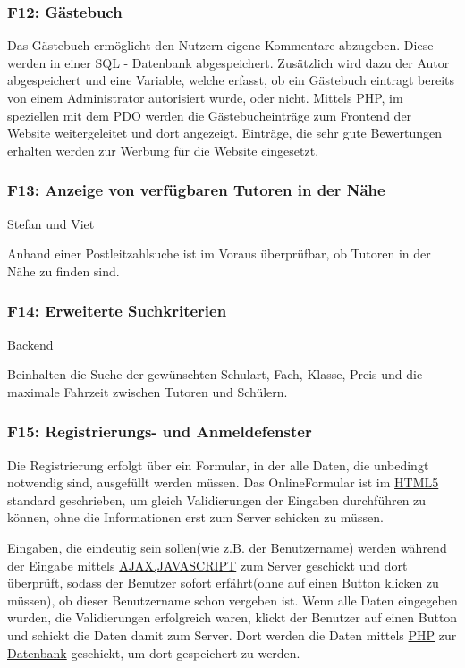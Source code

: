 \documentclass[10pt,a4paper]{scrartcl}
\begin{document}
\subsubsection*{F12: Gästebuch}

Das Gästebuch ermöglicht den Nutzern eigene Kommentare abzugeben. Diese werden in einer SQL - Datenbank abgespeichert. Zusätzlich wird dazu der Autor abgespeichert und eine Variable, welche erfasst, ob ein Gästebuch eintragt bereits von einem Administrator autorisiert wurde, oder nicht. Mittels PHP, im speziellen mit dem PDO werden die Gästebucheinträge zum Frontend der Website weitergeleitet und dort angezeigt. Einträge, die sehr gute Bewertungen erhalten werden zur Werbung für die Website eingesetzt.

\subsubsection*{F13: Anzeige von verfügbaren Tutoren in der Nähe}

Stefan und Viet

Anhand einer Postleitzahlsuche ist im Voraus überprüfbar, ob Tutoren in der Nähe zu finden sind.

\subsubsection*{F14: Erweiterte Suchkriterien}

Backend

Beinhalten die Suche der gewünschten Schulart, Fach, Klasse, Preis und die maximale Fahrzeit zwischen Tutoren und Schülern. 

\subsubsection*{F15: Registrierungs- und Anmeldefenster}

Die Registrierung erfolgt über ein Formular, in der alle Daten, die unbedingt notwendig sind, ausgefüllt werden müssen.
Das OnlineFormular ist im \underline{HTML5} standard geschrieben, um gleich Validierungen der Eingaben durchführen zu können, 
ohne die Informationen erst zum Server schicken zu müssen.

Eingaben, die eindeutig sein sollen(wie z.B. der Benutzername) werden während der Eingabe mittels \underline{AJAX,JAVASCRIPT} 
zum Server geschickt und dort überprüft, sodass der Benutzer sofort erfährt(ohne auf einen Button klicken zu müssen), ob dieser Benutzername schon vergeben ist. Wenn alle Daten eingegeben wurden, die Validierungen erfolgreich waren, klickt der Benutzer auf einen Button und schickt die Daten damit zum Server. Dort werden die Daten mittels \underline{PHP} zur \underline{Datenbank} geschickt, um dort gespeichert zu werden.
\end{document}
